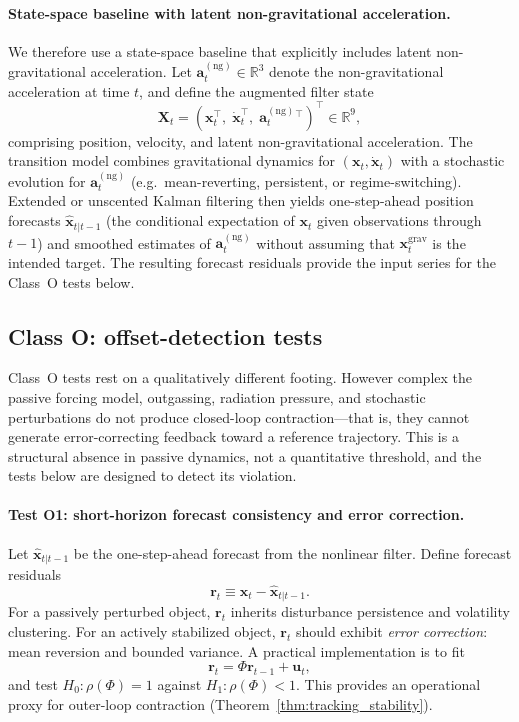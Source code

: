 \documentclass{article}
\begin{document}
\paragraph{State-space baseline with latent non-gravitational acceleration.}
We therefore use a state-space baseline that explicitly includes latent non-gravitational acceleration. Let $\mathbf{a}^{(\mathrm{ng})}_t\in\mathbb{R}^3$ denote the non-gravitational acceleration at time $t$, and define the augmented filter state
\[
\mathbf{X}_t = (\mathbf{x}_t^\top,\;\dot{\mathbf{x}}_t^\top,\;\mathbf{a}^{(\mathrm{ng})}_t{}^\top)^\top \in \mathbb{R}^9,
\]
comprising position, velocity, and latent non-gravitational acceleration. The transition model combines gravitational dynamics for $(\mathbf{x}_t,\dot{\mathbf{x}}_t)$ with a stochastic evolution for $\mathbf{a}^{(\mathrm{ng})}_t$ (e.g.\ mean-reverting, persistent, or regime-switching). Extended or unscented Kalman filtering then yields one-step-ahead position forecasts $\hat{\mathbf{x}}_{t|t-1}$ (the conditional expectation of $\mathbf{x}_t$ given observations through $t-1$) and smoothed estimates of $\mathbf{a}^{(\mathrm{ng})}_t$ without assuming that $\mathbf{x}^{\mathrm{grav}}_t$ is the intended target. The resulting forecast residuals provide the input series for the Class~O tests below.



\subsection{Class O: offset-detection tests}

Class~O tests rest on a qualitatively different footing. However complex the passive forcing model, outgassing, radiation pressure, and stochastic perturbations do not produce closed-loop contraction---that is, they cannot generate error-correcting feedback toward a reference trajectory. This is a structural absence in passive dynamics, not a quantitative threshold, and the tests below are designed to detect its violation.

\paragraph{Test O1: short-horizon forecast consistency and error correction.}
Let $\hat{\mathbf{x}}_{t|t-1}$ be the one-step-ahead forecast from the nonlinear filter. Define forecast residuals
\begin{equation}
\mathbf{r}_t \equiv \mathbf{x}_t-\hat{\mathbf{x}}_{t|t-1}.
\label{eq:residual_def}
\end{equation}
For a passively perturbed object, $\mathbf{r}_t$ inherits disturbance persistence and volatility clustering. For an actively stabilized object, $\mathbf{r}_t$ should exhibit \emph{error correction}: mean reversion and bounded variance. A practical implementation is to fit
\[
\mathbf{r}_t = \Phi \mathbf{r}_{t-1} + \mathbf{u}_t,
\]
and test $H_0:\rho(\Phi)=1$ against $H_1:\rho(\Phi)<1$. This provides an operational proxy for outer-loop contraction (Theorem~\ref{thm:tracking_stability}).
\end{document}
